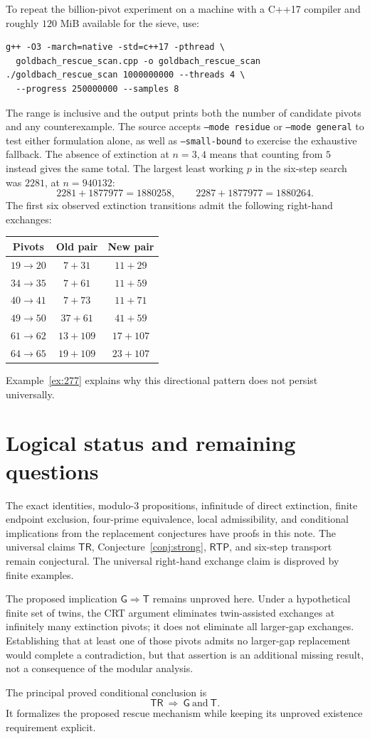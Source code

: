 \documentclass[11pt,a4paper]{article}
\theoremstyle{definition}
\theoremstyle{remark}
\newcommand{\TR}{\mathsf{TR}}
\newcommand{\RTP}{\mathsf{RTP}}
\newcommand{\GB}{\mathsf G}
\newcommand{\TP}{\mathsf T}
\begin{document}
To repeat the billion-pivot experiment on a machine with a C++17
compiler and roughly $120$ MiB available for the sieve, use:
\begin{verbatim}
g++ -O3 -march=native -std=c++17 -pthread \
  goldbach_rescue_scan.cpp -o goldbach_rescue_scan
./goldbach_rescue_scan 1000000000 --threads 4 \
  --progress 250000000 --samples 8
\end{verbatim}
The range is inclusive and the output prints both the number of
candidate pivots and any counterexample. The source accepts
\texttt{--mode residue} or \texttt{--mode general} to test either
formulation alone, as well as \texttt{--small-bound} to exercise
the exhaustive fallback.
The absence of extinction at $n=3,4$ means that counting from $5$ instead gives the same total. The largest least working $p$ in the six-step search was $2281$, at $n=940132$:
\[
 2281+1877977=1880258,\qquad
 2287+1877977=1880264.
\]
The first six observed extinction transitions admit the following right-hand exchanges:
\begin{center}
\begin{tabular}{@{}ccc@{}}
\toprule
Pivots & Old pair & New pair\\
\midrule
$19\to20$ & $7+31$ & $11+29$\\
$34\to35$ & $7+61$ & $11+59$\\
$40\to41$ & $7+73$ & $11+71$\\
$49\to50$ & $37+61$ & $41+59$\\
$61\to62$ & $13+109$ & $17+107$\\
$64\to65$ & $19+109$ & $23+107$\\
\bottomrule
\end{tabular}
\end{center}
Example~\ref{ex:277} explains why this directional pattern does not persist universally.

\section{Logical status and remaining questions}
The exact identities, modulo-$3$ propositions, infinitude of direct extinction, finite endpoint exclusion, four-prime equivalence, local admissibility, and conditional implications from the replacement conjectures have proofs in this note. The universal claims $\TR$, Conjecture~\ref{conj:strong}, $\RTP$, and six-step transport remain conjectural. The universal right-hand exchange claim is disproved by finite examples.

The proposed implication $\GB\Rightarrow\TP$ remains unproved here. Under a hypothetical finite set of twins, the CRT argument eliminates twin-assisted exchanges at infinitely many extinction pivots; it does not eliminate all larger-gap exchanges. Establishing that at least one of those pivots admits no larger-gap replacement would complete a contradiction, but that assertion is an additional missing result, not a consequence of the modular analysis.

The principal proved conditional conclusion is
\[
 \boxed{\TR\ \Longrightarrow\ \GB\ \text{and}\ \TP.}
\]
It formalizes the proposed rescue mechanism while keeping its unproved existence requirement explicit.



\end{document}
